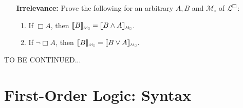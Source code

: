 \documentclass[a4paper, 11pt]{article} %
\newcommand*{\Scale}[2][4]{\scalebox{#1}{$#2$}}%
\begin{document}
\begin{enumerate}[leftmargin=1.2in]
\begin{enumerate}[label=(\arabic*),resume]
\begin{multicols}{2}
		      \end{multicols}
	      \end{enumerate}
	\item[\bf Irrelevance:] Prove the following for an arbitrary $A,B$ and $\mathcal{M}_\square$ of $\mathcal{L}^{\square}$:
	      \begin{enumerate}[label=(\arabic*),resume]\small
		      \item If $\Box A$, then $\interpret{B}_{\Scale[0.5]{\mathcal{M}_\square}}=\interpret{B\wedge A}_{\Scale[0.5]{\mathcal{M}_\square}}$.
		      \item If $\neg\Box A$, then $\interpret{B}_{\Scale[0.5]{\mathcal{M}_\square}}=\interpret{B\vee A}_{\Scale[0.5]{\mathcal{M}_\square}}$.
	      \end{enumerate}
\end{enumerate}


\pagebreak
\noindent
TO BE CONTINUED...
\pagebreak





\section*{\sc First-Order Logic: Syntax}
\end{document}
